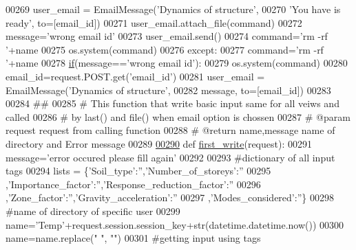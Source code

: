 \begin{DoxyCode}
00269         user\_email = EmailMessage(\textcolor{stringliteral}{'Dynamics of structure'},
00270         \textcolor{stringliteral}{'You have is ready'}, to=[email\_id])
00271         user\_email.attach\_file(command)
00272         message=\textcolor{stringliteral}{'wrong email id'}
00273         user\_email.send()
00274         command=\textcolor{stringliteral}{'rm -rf '}+name
00275         os.system(command)
00276     \textcolor{keywordflow}{except}:
00277         command=\textcolor{stringliteral}{'rm -rf '}+name
00278         \hyperlink{bootstrap_8min_8js_ac2d69f5011896c6ed4a54e0dd36f6334}{if}(message==\textcolor{stringliteral}{'wrong email id'}):
00279                     os.system(command)
00280                 email\_id=request.POST.get(\textcolor{stringliteral}{'email\_id'})
00281         user\_email = EmailMessage(\textcolor{stringliteral}{'Dynamics of structure'},
00282         message, to=[email\_id])
00283 
00284 \textcolor{comment}{##}
00285 \textcolor{comment}{# This function that write basic input same for all veiws and called}
00286 \textcolor{comment}{# by last() and file() when email option is chossen}
00287 \textcolor{comment}{# @param request request from calling function }
00288 \textcolor{comment}{# @return name,message name of directory and Error message  }
00289 
\hypertarget{views_8py_source_l00290}{}\hyperlink{namespacecivilsage_1_1views_ad9397359f36a9df37e0aa43f3be032a3}{00290} \textcolor{keyword}{def }\hyperlink{namespacecivilsage_1_1views_ad9397359f36a9df37e0aa43f3be032a3}{first\_write}(request):
00291     message=\textcolor{stringliteral}{'error occured please fill again'}
00292 
00293     \textcolor{comment}{#dictionary of all input tags}
00294     lists = \{\textcolor{stringliteral}{'Soil\_type'}:\textcolor{stringliteral}{''},\textcolor{stringliteral}{'Number\_of\_storeys'}:\textcolor{stringliteral}{''}
00295     ,\textcolor{stringliteral}{'Importance\_factor'}:\textcolor{stringliteral}{''},\textcolor{stringliteral}{'Response\_reduction\_factor'}:\textcolor{stringliteral}{''}
00296     ,\textcolor{stringliteral}{'Zone\_factor'}:\textcolor{stringliteral}{''},\textcolor{stringliteral}{'Gravity\_acceleration'}:\textcolor{stringliteral}{''}
00297     ,\textcolor{stringliteral}{'Modes\_considered'}:\textcolor{stringliteral}{''}\}
00298     \textcolor{comment}{#name of directory of specific user}
00299     name=\textcolor{stringliteral}{'Temp'}+request.session.session\_key+str(datetime.datetime.now())
00300     name=name.replace(\textcolor{stringliteral}{" "}, \textcolor{stringliteral}{""})
00301     \textcolor{comment}{#getting input using tags}

\end{DoxyCode}
